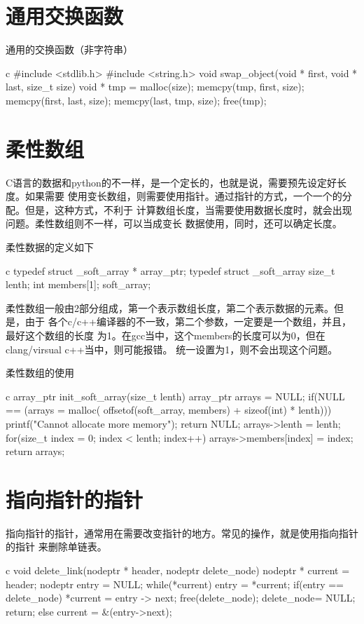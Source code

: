 \section{通用交换函数}
通用的交换函数（非字符串）
\begin{code-block}{c}
#include <stdlib.h>
#include <string.h>
void swap_object(void * first, void * last, size_t size)
{
    void * tmp = malloc(size);
    memcpy(tmp, first, size);
    memcpy(first, last, size);
    memcpy(last, tmp, size);
    free(tmp);
}
\end{code-block}

\section{柔性数组}
C语言的数据和python的不一样，是一个定长的，也就是说，需要预先设定好长度。如果需要
使用变长数组，则需要使用指针。通过指针的方式，一个一个的分配。但是，这种方式，不利于
计算数组长度，当需要使用数据长度时，就会出现问题。柔性数组则不一样，可以当成变长
数据使用，同时，还可以确定长度。

柔性数据的定义如下
\begin{code-block}{c}
typedef struct _soft_array * array_ptr;
typedef struct _soft_array{
    size_t lenth;
    int members[1];
}soft_array;
\end{code-block}

柔性数组一般由2部分组成，第一个表示数组长度，第二个表示数据的元素。但是，由于
各个c/c++编译器的不一致，第二个参数，一定要是一个数组，并且，最好这个数组的长度
为1。在gcc当中，这个members的长度可以为0，但在clang/virsual c++当中，则可能报错。
统一设置为1，则不会出现这个问题。

柔性数组的使用
\begin{code-block}{c}
array_ptr init_soft_array(size_t lenth){
    array_ptr arrays = NULL;
    if(NULL == (arrays = malloc(
        offsetof(soft_array, members) + sizeof(int) * lenth))){
        printf("Cannot allocate more memory\n");
        return NULL;
    }
    arrays->lenth = lenth;
    for(size_t index = 0; index < lenth; index++){
        arrays->members[index] = index;
    }
    return arrays;
}
\end{code-block}

\section{指向指针的指针}
指向指针的指针，通常用在需要改变指针的地方。常见的操作，就是使用指向指针的指针
来删除单链表。
\begin{code-block}{c}
void delete_link(nodeptr * header, nodeptr delete_node) {
    nodeptr * current = header;
    nodeptr entry = NULL;
    while(*current) {
        entry = *current;
        if(entry == delete_node) {
            *current = entry -> next;
            free(delete_node);
            delete_node= NULL;
            return;
        } else {
            current = &(entry->next);
        }
    }
}
\end{code-block}

